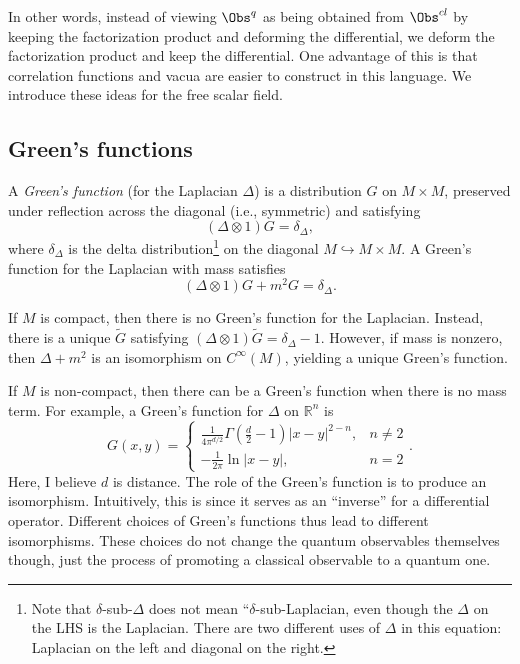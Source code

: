 In other words, instead of viewing $\Obs^{q} $ as being obtained from $\Obs^{cl} $ by keeping the factorization product and deforming the differential, we deform the factorization product and keep the differential. One advantage of this is that correlation functions and vacua are easier to construct in this language. We introduce these ideas for the free scalar field.

\subsection{Green's functions}

\begin{definition}\label{dfn:4-6-1}
	A \emph{Green's function} (for the Laplacian $\Delta $) is a distribution $G$ on $M\times M$, preserved under reflection across the diagonal (i.e., symmetric) and satisfying
	\[
		(\Delta \otimes 1)G=\delta _{\Delta } ,
	\]
	where $\delta _{\Delta } $ is the delta distribution\footnote{Note that $\delta $-sub-$\Delta $ does not mean ``$\delta $-sub-Laplacian, even though the $\Delta $ on the LHS is the Laplacian. There are two different uses of $\Delta $ in this equation: Laplacian on the left and diagonal on the right.} on the diagonal $M\hookrightarrow M\times M$. A Green's function for the Laplacian with mass satisfies
	\[
		(\Delta \otimes 1)G + m^2G = \delta _{\Delta } 
	.\]
\end{definition}

If $M$ is compact, then there is no Green's function for the Laplacian. Instead, there is a unique $\widetilde{G} $ satisfying $(\Delta \otimes 1) \widetilde{G} =\delta _{\Delta } -1$. However, if mass is nonzero, then $\Delta + m^2$ is an isomorphism on $C^\infty (M)$, yielding a unique Green's function.

If $M$ is non-compact, then there can be a Green's function when there is no mass term. For example, a Green's function for $\Delta $ on $\mathbb{R} ^n$ is
\[
	G(x,y)=
	\begin{cases}
		\frac{1}{4\pi ^{d/2} } \Gamma (\frac{d}{2} -1)\left| x-y \right| ^{2-n} ,& n\neq 2\\
		-\frac{1}{2\pi } \ln \left| x-y \right| ,& n=2
	\end{cases}
.\]
Here, I believe $d$ is distance. The role of the Green's function is to produce an isomorphism. Intuitively, this is since it serves as an ``inverse'' for a differential operator. Different choices of Green's functions thus lead to different isomorphisms. These choices do not change the quantum observables themselves though, just the process of promoting a classical observable to a quantum one.

